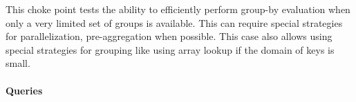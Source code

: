 
This choke point tests the ability to efficiently perform group-by evaluation
when only a very limited set of groups is available.  This can require special
strategies for parallelization, \eg pre-aggregation when possible. This case also allows using special strategies for grouping like using array lookup if the domain of keys is small.


\paragraph{Queries}
{\raggedright

}